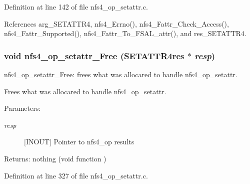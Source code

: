 Definition at line 142 of file nfs4\_\-op\_\-setattr.c.

References arg\_\-SETATTR4, nfs4\_\-Errno(), nfs4\_\-Fattr\_\-Check\_\-Access(), nfs4\_\-Fattr\_\-Supported(), nfs4\_\-Fattr\_\-To\_\-FSAL\_\-attr(), and res\_\-SETATTR4.
\subsubsection{\setlength{\rightskip}{0pt plus 5cm}void nfs4\_\-op\_\-setattr\_\-Free (SETATTR4res $\ast$ {\em resp})}\label{nfs4__op__setattr_8c_a3}


nfs4\_\-op\_\-setattr\_\-Free: frees what was allocared to handle nfs4\_\-op\_\-setattr.

Frees what was allocared to handle nfs4\_\-op\_\-setattr.

\begin{Desc}
\item[Parameters:]
\begin{description}
\item[{\em resp}][INOUT] Pointer to nfs4\_\-op results\end{description}
\end{Desc}
\begin{Desc}
\item[Returns:]nothing (void function ) \end{Desc}


Definition at line 327 of file nfs4\_\-op\_\-setattr.c.